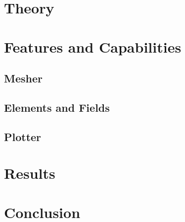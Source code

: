 \documentclass[headings=standardclasses, abstract=true]{scrartcl}
\begin{document}
\section{Theory}

\section{Features and Capabilities}

\subsection{Mesher}

\subsection{Elements and Fields}

\subsection{Plotter}

\section{Results}

\section{Conclusion}

\printbibliography
\end{document}
